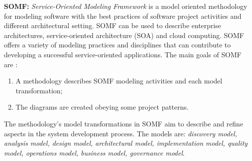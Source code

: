 \bigskip

\textbf{SOMF:} \textit{Service-Oriented Modeling Framework} \cite{somf} is a 
model oriented methodology for modeling software with the best practices of
software project activities and different architectural setting. SOMF can be
used to describe enterprise architectures, service-oriented architecture (SOA)
and cloud computing. SOMF offers a variety of modeling practices and disciplines
that can contribute to developing a successful service-oriented applications. 
The main goals of SOMF are \cite{somf}:
      


\begin{enumerate}
  \item A methodology describes SOMF modeling
  activities and each model transformation;
  \item The diagrams are created obeying some project
  patterns.
\end{enumerate}

The methodology's model transformations in SOMF aim to
describe and refine aspects in the system development
process. The models are: \textit{discovery model, analysis model, design model,
architectural model, implementation model, quality model, operations model,
business model, governance model}. 

% 


